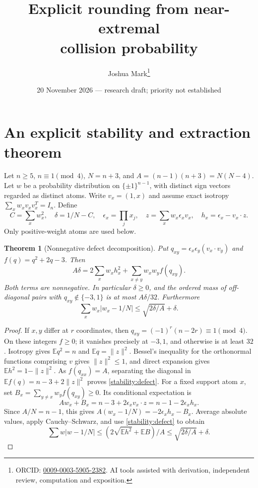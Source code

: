 \documentclass[11pt]{article}
\title{Explicit rounding from near-extremal\\collision probability}
\author{Joshua Mark\thanks{ORCID: \href{https://orcid.org/0009-0003-5905-2382}{0009-0003-5905-2382}. AI tools assisted with derivation, independent review, computation and exposition.}}
\date{20 November 2026 --- research draft; priority not established}
\newtheorem{theorem}{Theorem}[section]
\newcommand{\E}{\mathbb E}
\begin{document}
\maketitle

\section{An explicit stability and extraction theorem}

Let $n\ge5$, $n\equiv1\pmod4$, $N=n+3$, and
$A=(n-1)(n+3)=N(N-4)$. Let $w$ be a probability distribution on
$\{\pm1\}^{n-1}$, with distinct sign vectors regarded as distinct atoms.
Write $v_x=(1,x)$ and assume exact isotropy
$\sum_x w_xv_xv_x^T=I_n$. Define
\[
 C=\sum_xw_x^2,\quad \delta=1/N-C,\quad
 \epsilon_x=\prod_jx_j,\quad z=\sum_xw_x\epsilon_xv_x,
 \quad h_x=\epsilon_x-v_x\cdot z.
\]
Only positive-weight atoms are used below.

\begin{theorem}[Nonnegative defect decomposition]
Put $q_{xy}=\epsilon_x\epsilon_y(v_x\cdot v_y)$ and
$f(q)=q^2+2q-3$. Then
\begin{equation}\label{stability:defect}
 A\delta=2\sum_xw_xh_x^2+
 \sum_{x\ne y}w_xw_y f(q_{xy}).
\end{equation}
Both terms are nonnegative. In particular $\delta\ge0$, and the
ordered mass of off-diagonal pairs with $q_{xy}\notin\{-3,1\}$ is
at most $A\delta/32$. Furthermore
\begin{equation}\label{stability:disp}
 \sum_xw_x|w_x-1/N|\le \sqrt{2\delta/A}+\delta.
\end{equation}
\end{theorem}
\begin{proof}
If $x,y$ differ at $r$ coordinates, then
$q_{xy}=(-1)^r(n-2r)\equiv1\pmod4$. On these integers $f\ge0$;
it vanishes precisely at $-3,1$, and otherwise is at least $32$.
Isotropy gives $\E q^2=n$ and $\E q=\|z\|^2$.
Bessel's inequality for the orthonormal functions comprising $v$ gives
$\|z\|^2\le1$, and direct expansion gives
$\E h^2=1-\|z\|^2$. As $f(q_{xx})=A$, separating the diagonal in
$\E f(q)=n-3+2\|z\|^2$ proves \eqref{stability:defect}.
For a fixed support atom $x$, set
$B_x=\sum_{y\ne x}w_yf(q_{xy})\ge0$. Its conditional expectation is
\[
 Aw_x+B_x=n-3+2\epsilon_x v_x\cdot z
 =n-1-2\epsilon_xh_x.
\]
Since $A/N=n-1$, this gives
$A(w_x-1/N)=-2\epsilon_xh_x-B_x$. Average absolute values,
apply Cauchy--Schwarz, and use \eqref{stability:defect} to obtain
\[
 \sum w|w-1/N|\le (2\sqrt{\E h^2}+\E B)/A
 \le\sqrt{2\delta/A}+\delta.
\]
\end{proof}
\end{document}
